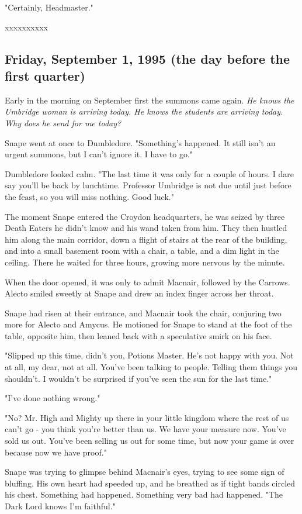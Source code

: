 \documentclass[a4paper,11pt]{article}
\begin{document}
"Certainly, Headmaster."

xxxxxxxxxx

\subsection{Friday, September 1, 1995 (the day before the first quarter)}

Early in the morning on September first the summons came again. \emph{He knows the Umbridge woman is arriving today. He knows the students are arriving today. Why does he send for me today?}

Snape went at once to Dumbledore. "Something's happened. It still isn't an urgent summons, but I can't ignore it. I have to go."

Dumbledore looked calm. "The last time it was only for a couple of hours. I dare say you'll be back by lunchtime. Professor Umbridge is not due until just before the feast, so you will miss nothing. Good luck."

The moment Snape entered the Croydon headquarters, he was seized by three Death Eaters he didn't know and his wand taken from him. They then hustled him along the main corridor, down a flight of stairs at the rear of the building, and into a small basement room with a chair, a table, and a dim light in the ceiling. There he waited for three hours, growing more nervous by the minute.

When the door opened, it was only to admit Macnair, followed by the Carrows. Alecto smiled sweetly at Snape and drew an index finger across her throat.

Snape had risen at their entrance, and Macnair took the chair, conjuring two more for Alecto and Amycus. He motioned for Snape to stand at the foot of the table, opposite him, then leaned back with a speculative smirk on his face.

"Slipped up this time, didn't you, Potions Master. He's not happy with you. Not at all, my dear, not at all. You've been talking to people. Telling them things you shouldn't. I wouldn't be surprised if you've seen the sun for the last time."

"I've done nothing wrong."

"No? Mr. High and Mighty up there in your little kingdom where the rest of us can't go - you think you're better than us. We have your measure now. You've sold us out. You've been selling us out for some time, but now your game is over because now we have proof."

Snape was trying to glimpse behind Macnair's eyes, trying to see some sign of bluffing. His own heart had speeded up, and he breathed as if tight bands circled his chest. Something had happened. Something very bad had happened. "The Dark Lord knows I'm faithful."
\end{document}
